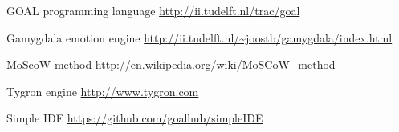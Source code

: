 \documentclass[11pt]{article}
\begin{document}
\begin{thebibliography}{9}
	
	GOAL programming language
	\url{http://ii.tudelft.nl/trac/goal}
	
	Gamygdala emotion engine
	\url{http://ii.tudelft.nl/~joostb/gamygdala/index.html}
	
	MoScoW method
	\url{http://en.wikipedia.org/wiki/MoSCoW_method }
	
	Tygron engine
	\url{http://www.tygron.com }
	
	Simple IDE
	\url{https://github.com/goalhub/simpleIDE }
	
	
\end{thebibliography}
\end{document}
